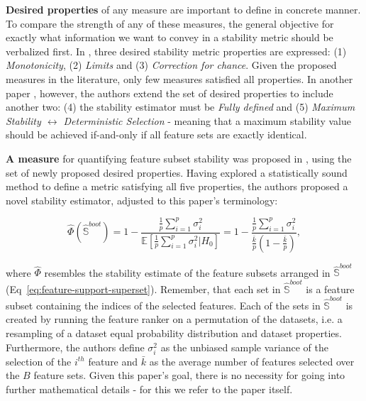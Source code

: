 \documentclass{article}
\begin{document}
\textbf{Desired properties} of any measure are important to define in concrete manner. To compare the strength of any of these measures, the general objective for exactly what information we want to convey in a stability metric should be verbalized first. In \citep{mohana_chelvan_survey_2016}, three desired stability metric properties are expressed: (1) \textit{Monotonicity}, (2) \textit{Limits} and (3) \textit{Correction for chance}. Given the proposed measures in the literature, only few measures satisfied all properties. In another paper \citep{nogueira_stability_2017}, however, the authors extend the set of desired properties to include another two: (4) the stability estimator must be \textit{Fully defined} and (5) \textit{Maximum Stability $\leftrightarrow$ Deterministic Selection} - meaning that a maximum stability value should be achieved if-and-only if all feature sets are exactly identical.

\textbf{A measure} for quantifying feature subset stability was proposed in \citep{nogueira_stability_2017}, using the set of newly proposed desired properties. Having explored a statistically sound method to define a metric satisfying all five properties, the authors proposed a novel stability estimator, adjusted to this paper's terminology:

\begin{equation}\label{eq:stability-measure}
\hat{\Phi}(\hat{\mathbb{S}}^{boot})=1-\frac{\frac{1}{p} \sum_{i=1}^{p} \sigma_{i}^{2}}{\mathbb{E}\left[\frac{1}{p} \sum_{i=1}^{p} \sigma_{i}^{2} | H_{0}\right]}=1-\frac{\frac{1}{p} \sum_{i=1}^{p} \sigma_{i}^{2}}{\frac{\bar{k}}{p}\left(1-\frac{\bar{k}}{p}\right)},
\end{equation}

where $\hat{\Phi}$ resembles the stability estimate of the feature subsets arranged in $\hat{\mathbb{S}}^{boot}$ (Eq~\ref{eq:feature-support-superset}). Remember, that each set in $\hat{\mathbb{S}}^{boot}$ is a feature subset containing the indices of the selected features. Each of the sets in $\hat{\mathbb{S}}^{boot}$ is created by running the feature ranker on a permutation of the datasets, i.e. a resampling of a dataset equal probability distribution and dataset properties. Furthermore, the authors define $\sigma_{i}^{2}$ as the unbiased sample variance of the selection of the $i^{t h}$ feature and $\bar{k}$ as the average number of features selected over the $B$ feature sets. Given this paper's goal, there is no necessity for going into further mathematical details - for this we refer to the paper itself.
\end{document}

